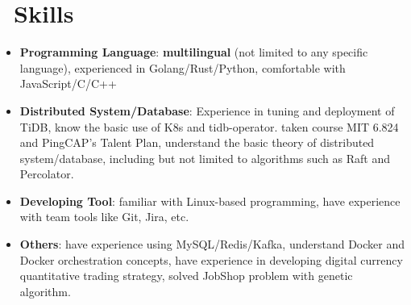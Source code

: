 \documentclass{resume}
\newcommand{\en}[1]{#1}
\newcommand{\zh}[1]{}
\begin{document}
\section{\faCogs\ \en{Skills}\zh{技能}}
\begin{itemize}[parsep=0.25ex]
      \item \en{\textbf{Programming Language}:
                  \textbf{multilingual} (not limited to any specific language), 
                  experienced in Golang/Rust/Python, 
                  comfortable with JavaScript/C/C++}
            \zh{\textbf{编程语言}:
                  \textbf{泛语言}（编程不受特定语言限制），
                  熟悉 Golang/Rust/Python，
                  了解 JavaScript/C/C++ 等}

      \item \en{\textbf{Distributed System/Database}:
                  Experience in tuning and deployment of TiDB, know the basic use of K8s and tidb-operator.
                  taken course MIT 6.824 and PingCAP's Talent Plan,
                  understand the basic theory of distributed system/database,
                  including but not limited to algorithms such as Raft and Percolator.}
            \zh{\textbf{分布式系统/数据库}:
                  有分布式数据库 TiDB 的调优开发以及部署经验，了解 K8s 以及 tidb-operator 的基本使用。
                  自主学习了 MIT 6.824 和 PingCAP's Talent Plan 等课程，
                  了解分布式系统/数据库的基本理论，包括但不限于 Raft 和 Percolator 等算法}

      \item \en{\textbf{Developing Tool}:
                  familiar with Linux-based programming,
                  have experience with team tools like Git, Jira, etc.}
            \zh{\textbf{开发工具}:
                  熟悉 Linux，有 Git、Jira 等团队协作工具的使用经验}

      \item \en{\textbf{Others}:
                  have experience using MySQL/Redis/Kafka, 
                  understand Docker and Docker orchestration concepts, 
                  have experience in developing digital currency quantitative trading strategy, 
                  solved JobShop problem with genetic algorithm.}
            \zh{\textbf{其它}:
                  有 MySQL/Redis/Kafka 使用经验，了解容器及容器编排相关概念，
                  开发过数字货币量化交易策略，使用遗传算法解决过 JobShop 问题}
\end{itemize}
\end{document}
